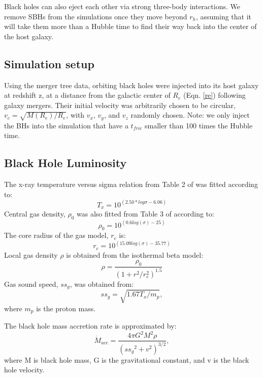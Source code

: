 \documentclass[english, apj]{emulateapj}
\begin{document}
Black holes can also eject each other via strong three-body interactions. We remove SBHs from the simulations once they move beyond $r_h$, assuming that it will take them more than a Hubble time to find their way back into the center of the host galaxy.

\subsection{Simulation setup}
Using the merger tree data, orbiting black holes were injected into its host galaxy at redshift z, at a distance from the galactic center of $R_{e}$ (Eqn. \ref{re}) following galaxy mergers.  Their initial velocity was arbitrarily chosen to be circular, $v_c = \sqrt{M(R_e)/R_e}$, with $v_x$, $v_y$, and $v_z$ randomly chosen.  Note: we only inject the BHs into the simulation that have a $t_{fric}$ smaller than 100 times the Hubble time.

\subsection{Black Hole Luminosity}
The x-ray temperature versus sigma relation from Table 2 of  \citet{2018ApJ...857...32B} was fitted according to:
\begin{equation}
    T_x = 10^{(2.50*log \sigma - 6.06)}
\end{equation}
Central gas density, ${\rho}_0$ was also fitted from Table 3 of \citet{2018ApJ...857...32B} according to:
\begin{equation}
    \rho_0 = 10^{(0.6log(\sigma) - 25)}
\end{equation}
The core radius of the gas model, ${r_c}$ is:
\begin{equation}
    r_c = 10^{(15.09log(\sigma) - 35.77)}
\end{equation}
Local gas density ${\rho}$ is obtained from the isothermal beta model:
\begin{equation}
    \rho = \frac{\rho_0}{(1+r^2/r_c^2)^{1.5}}
\end{equation}
Gas sound speed, ${ss}_g$, was obtained from:
\begin{equation}
    {ss}_g = \sqrt{1.67T_x/m_p},
\end{equation}
where $m_p$ is the proton mass.

The black hole mass accretion rate is approximated by:
\begin{equation}
    \dot{M}_{acc} = \frac{4{\pi}G^2M^2\rho}{({ss_g}^2+v^2)^{3/2}},
\end{equation}
where M is black hole mass, G is the gravitational constant, and v is the black hole velocity.
\end{document}
